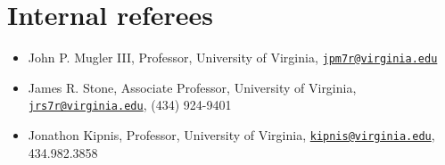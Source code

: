 \documentclass[12pt,]{article}
\providecommand{\tightlist}{%
  \setlength{\itemsep}{0pt}\setlength{\parskip}{0pt}}
\begin{document}
\section{Internal referees}\label{internal-referees}

\begin{itemize}
\tightlist
\item
  John P. Mugler III, Professor, University of Virginia,
  \href{mailto:jpm7r@virginia.edu}{\nolinkurl{jpm7r@virginia.edu}}
\item
  James R. Stone, Associate Professor, University of Virginia,
  \href{mailto:jrs7r@virginia.edu}{\nolinkurl{jrs7r@virginia.edu}},
  (434) 924-9401
\item
  Jonathon Kipnis, Professor, University of Virginia,
  \href{mailto:kipnis@virginia.edu}{\nolinkurl{kipnis@virginia.edu}},
  434.982.3858
\end{itemize}
\end{document}
